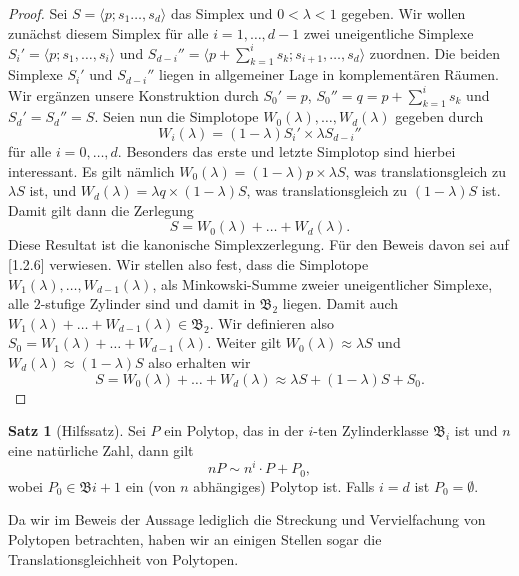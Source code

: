 \documentclass[11pt,titlepage]{article}
\theoremstyle{definition}
\newtheorem{theorem}{Satz}[section]
\theoremstyle{remark}
\begin{document}
	\begin{proof}
		Sei $S=\langle p;s_1\ldots,s_d\rangle$ das Simplex und 
		$0<\lambda<1$ gegeben. Wir wollen 
		zunächst diesem Simplex für alle $i=1,\ldots,d-1$ zwei 
		uneigentliche Simplexe $S_i'=\langle p;s_1,\ldots,s_i\rangle$ und 
		$S_{d-i}''=\langle p+\sum_{k=1}^i s_k ;s_{i+1},\ldots,s_d\rangle$ 
		zuordnen. Die beiden Simplexe $S_i'$ und $S_{d-i}''$ liegen 
		in allgemeiner Lage in komplementären Räumen. Wir ergänzen 
		unsere Konstruktion durch $S_0'=p$, $S_0''=q=p+\sum_{k=1}^i s_k$ und 
		$S_d'=S_d''=S$. Seien nun die Simplotope 
		$W_0(\lambda),\ldots,W_d(\lambda)$ gegeben durch
		\[W_i(\lambda)=(1-\lambda)S_i' \times \lambda S_{d-i}''\]
		für alle $i=0,\ldots,d$. Besonders das erste und letzte Simplotop 
		sind hierbei interessant. Es gilt nämlich 
		$W_0(\lambda)=(1-\lambda)p\times \lambda S$, was translationsgleich 
		zu $\lambda S$ ist, und $W_d(\lambda)=\lambda q\times (1-\lambda) S$, 
		was translationsgleich zu $(1-\lambda)S$ ist. Damit gilt dann 
		die Zerlegung
		\[S=W_0(\lambda)+\ldots+W_d(\lambda).\]
		Diese Resultat ist die kanonische Simplexzerlegung. Für den Beweis 
		davon sei auf \cite{Hadwiger}[1.2.6] verwiesen. 
		Wir stellen also fest, dass die Simplotope $W_1(\lambda),\ldots,W_{d-1}(\lambda)$, als 
		Minkowski-Summe zweier uneigentlicher Simplexe, alle $2$-stufige Zylinder 
		sind und damit in $\mathfrak{B}_2$ liegen. Damit auch 
		$W_1(\lambda)+\ldots+W_{d-1}(\lambda)\in\mathfrak{B}_2$. Wir 
		definieren also $S_0=W_1(\lambda)+\ldots+W_{d-1}(\lambda)$. 
		Weiter gilt $W_0(\lambda)\approx \lambda S$ und 
		$W_d(\lambda)\approx (1-\lambda)S$ also erhalten wir
		\[S=W_0(\lambda)+\ldots+W_d(\lambda)\approx \lambda S+(1-\lambda)S+S_0.\]
	\end{proof}
	
	\begin{theorem}[Hilfssatz]\label{thm:hilfssatz}
		Sei $P$ ein Polytop, das in der $i$-ten Zylinderklasse $\mathfrak{B}_i$ ist 
		und $n$ eine natürliche Zahl, dann gilt
		\[nP\sim n^i\cdot P+P_0,\]
		wobei $P_0\in\mathfrak{B}{i+1}$ ein (von $n$ abhängiges) Polytop ist. 
		Falls $i=d$ ist $P_0=\emptyset$.
	\end{theorem}
	
	Da wir im 
	Beweis der Aussage lediglich die Streckung und Vervielfachung von Polytopen 
	betrachten, haben wir an einigen Stellen sogar die Translationsgleichheit 
	von Polytopen.
	
\end{document}

